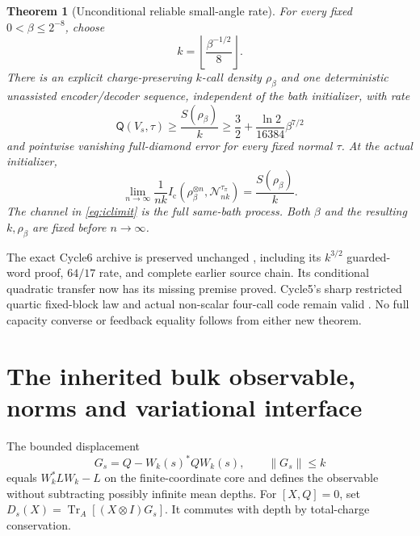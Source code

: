 \documentclass[11pt]{article}
\newtheorem{theorem}{Theorem}[section]
\newcommand{\Tr}{\operatorname{Tr}}
\newcommand{\norm}[1]{\lVert #1\rVert}
\newcommand{\Ic}{I_{\mathrm c}}
\newcommand{\Qcap}{\mathsf Q}
\begin{document}
\begin{theorem}[Unconditional reliable small-angle rate]\label{thm:rate}
For every fixed $0<\beta\le2^{-8}$, choose
\begin{equation}\label{eq:kchoice}
 k=\left\lfloor\frac{\beta^{-1/2}}8\right\rfloor.
\end{equation}
There is an explicit charge-preserving $k$-call density $\rho_\beta$
and one deterministic unassisted encoder/decoder sequence, independent
of the bath initializer, with rate
\begin{equation}\label{eq:rate}
 \Qcap(V_s,\tau)\ge\frac{S(\rho_\beta)}k
      \ge\frac32+\frac{\ln2}{16384}\beta^{7/2}
\end{equation}
and pointwise vanishing full-diamond error for every fixed normal $\tau$.
At the actual initializer,
\begin{equation}\label{eq:iclimit}
 \lim_{n\to\infty}\frac1{nk}
 \Ic(\rho_\beta^{\otimes n},\mathcal N_{nk}^{\tau_\pi})
       =\frac{S(\rho_\beta)}k.
\end{equation}
The channel in \eqref{eq:iclimit} is the full same-bath process. Both
$\beta$ and the resulting $k,\rho_\beta$ are fixed before $n\to\infty$.
\end{theorem}

The exact Cycle6 archive is preserved unchanged \cite{Cycle6}, including
its $k^{3/2}$ guarded-word proof, $64/17$ rate, and complete earlier
source chain. Its conditional quadratic transfer now has its missing
premise proved. Cycle5's sharp restricted quartic fixed-block law and
actual non-scalar four-call code remain valid \cite{Cycle5}. No full
capacity converse or feedback equality follows from either new theorem.

\section{The inherited bulk observable, norms and variational interface}
\label{sec:bulk}

The bounded displacement
\begin{equation}\label{eq:bounded}
 G_s=Q-W_k(s)^*QW_k(s),\qquad \norm{G_s}\le k
\end{equation}
equals $W_k^*LW_k-L$ on the finite-coordinate core and defines the
observable without subtracting possibly infinite mean depths.
For $[X,Q]=0$, set $D_s(X)=\Tr_A[(X\otimes I)G_s]$.
It commutes with depth by total-charge conservation.
\end{document}
